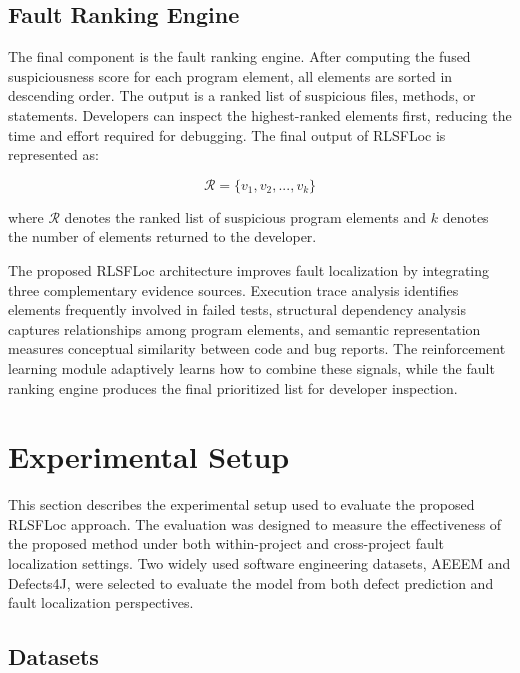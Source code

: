 \documentclass[article,article,submit,pdftex,moreauthors]{Definitions/mdpi}
\begin{document}
\subsection{Fault Ranking Engine}

The final component is the fault ranking engine. After computing the fused suspiciousness score for each program element, all elements are sorted in descending order. The output is a ranked list of suspicious files, methods, or statements. Developers can inspect the highest-ranked elements first, reducing the time and effort required for debugging. The final output of RLSFLoc is represented as:

\begin{equation}
\mathcal{R} = \{v_1, v_2, ..., v_k\}
\end{equation}

where $\mathcal{R}$ denotes the ranked list of suspicious program elements and $k$ denotes the number of elements returned to the developer.

The proposed RLSFLoc architecture improves fault localization by integrating three complementary evidence sources. Execution trace analysis identifies elements frequently involved in failed tests, structural dependency analysis captures relationships among program elements, and semantic representation measures conceptual similarity between code and bug reports. The reinforcement learning module adaptively learns how to combine these signals, while the fault ranking engine produces the final prioritized list for developer inspection.


\section{Experimental Setup}
\label{sec:experimental_setup}

This section describes the experimental setup used to evaluate the proposed RLSFLoc approach. The evaluation was designed to measure the effectiveness of the proposed method under both within-project and cross-project fault localization settings. Two widely used software engineering datasets, AEEEM and Defects4J, were selected to evaluate the model from both defect prediction and fault localization perspectives.

\subsection{Datasets}
\end{document}
